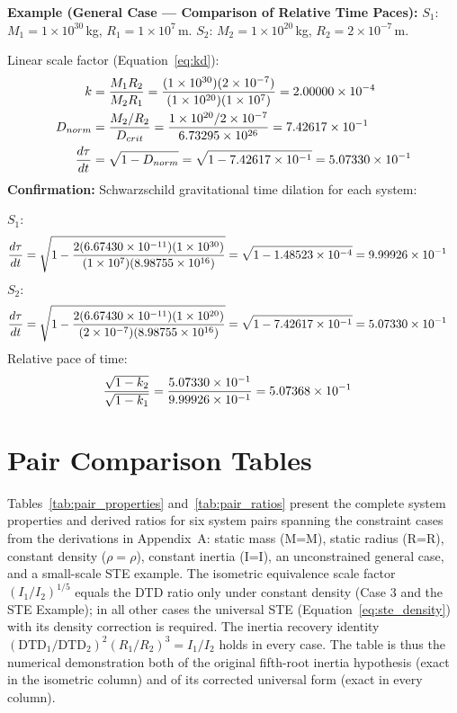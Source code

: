 \documentclass[twoside,twocolumn,9pt]{article}
\begin{document}
\begin{mdframed}
\textbf{Example (General Case --- Comparison of Relative Time Paces):} $S_1$: $M_1 = 1 \times 10^{30}$\,kg, $R_1 = 1 \times 10^{7}$\,m. $S_2$: $M_2 = 1 \times 10^{20}$\,kg, $R_2 = 2 \times 10^{-7}$\,m.

Linear scale factor (Equation~\ref{eq:kd}):
\begin{align}
k &= \frac{M_1 R_2}{M_2 R_1}
= \frac{(1 \times 10^{30})(2 \times 10^{-7})}{(1 \times 10^{20})(1 \times 10^{7})}
= 2.00000 \times 10^{-4} \notag \\
D_{norm} &= \frac{M_2/R_2}{D_{crit}}
= \frac{1 \times 10^{20}/2 \times 10^{-7}}{6.73295 \times 10^{26}}
= 7.42617 \times 10^{-1} \notag \\
\frac{d\tau}{dt} &= \sqrt{1 - D_{norm}}
= \sqrt{1 - 7.42617 \times 10^{-1}}
= 5.07330 \times 10^{-1} \notag
\end{align}
\textbf{Confirmation:} Schwarzschild gravitational time dilation for each system:

$S_1$:
\begin{align}
\frac{d\tau}{dt} &= \sqrt{1 - \frac{2(6.67430 \times 10^{-11})(1 \times 10^{30})}{(1 \times 10^{7})(8.98755 \times 10^{16})}}
= \sqrt{1 - 1.48523 \times 10^{-4}}
= 9.99926 \times 10^{-1} \notag
\end{align}
$S_2$:
\begin{align}
\frac{d\tau}{dt} &= \sqrt{1 - \frac{2(6.67430 \times 10^{-11})(1 \times 10^{20})}{(2 \times 10^{-7})(8.98755 \times 10^{16})}}
= \sqrt{1 - 7.42617 \times 10^{-1}}
= 5.07330 \times 10^{-1} \notag
\end{align}
Relative pace of time:
\begin{align}
\frac{\sqrt{1 - k_2}}{\sqrt{1 - k_1}} &= \frac{5.07330 \times 10^{-1}}{9.99926 \times 10^{-1}}
= 5.07368 \times 10^{-1} \notag
\end{align}
\end{mdframed}

\newpage
\section{Pair Comparison Tables} \label{app:pair_table}

Tables~\ref{tab:pair_properties} and~\ref{tab:pair_ratios} present the complete system properties and derived ratios for six system pairs spanning the constraint cases from the derivations in Appendix~A: static mass (M=M), static radius (R=R), constant density ($\rho=\rho$), constant inertia (I=I), an unconstrained general case, and a small-scale STE example. The isometric equivalence scale factor $(I_1/I_2)^{1/5}$ equals the DTD ratio only under constant density (Case 3 and the STE Example); in all other cases the universal STE (Equation~\ref{eq:ste_density}) with its density correction is required. The inertia recovery identity $(\text{DTD}_1/\text{DTD}_2)^2(R_1/R_2)^3 = I_1/I_2$ holds in every case. The table is thus the numerical demonstration both of the original fifth-root inertia hypothesis (exact in the isometric column) and of its corrected universal form (exact in every column).
\end{document}
